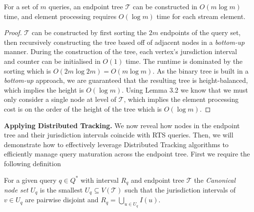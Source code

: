 \begin{lemma} For a set of $m$ queries, an endpoint tree $\mathcal{T}$ can be constructed in $O(m\log m)$ time, and element processing requires $O(\log m)$ time for each stream element.
\end{lemma}
\begin{proof}
     $\mathcal{T}$ can be constructed by first sorting the $2m$ endpoints of the query set, then recursively constructing the tree based off of adjacent nodes in a \textit{bottom-up} manner. During the construction of the tree, each vertex's jursdiction interval and counter can be initialised in $O(1)$ time. The runtime is dominated by the sorting which is $O(2m \log 2m) = O(m\log m)$. As the binary tree is built in a \textit{bottom-up} approach, we are guaranteed that the resulting tree is height-balanced, which implies the height is $O(\log m)$. Using Lemma 3.2 we know that we must only consider a single node at level of $\mathcal{T}$, which implies the element processing cost is on the order of the height of the tree which is $O(\log m)$.
\end{proof}

\textbf{Applying Distributed Tracking.} 
We now reveal how nodes in the endpoint tree and their jurisdiction intervals coincide with RTS queries. Then, we will demonstrate how to effectively leverage Distributed Tracking algorithms to efficiently manage query maturation across the endpoint tree. First we require the following definition

\begin{definition} For a given query $q\in Q^*$ with interval $R_q$ and endpoint tree $\mathcal{T}$ the \textit{Canonical node set} $U_q$ is the smallest $U_q\subseteq V(\mathcal{T})$ such that the jurisdiction intervals of $v\in U_q$ are pairwise disjoint and $R_q = \bigcup_{u\in U_q} I(u)$.
\end{definition}

